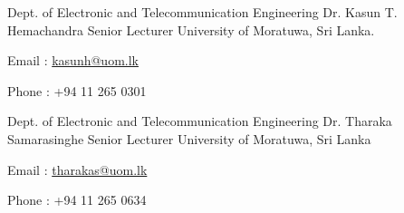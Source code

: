 


\begin{cventries}


\cventry
{Dept. of Electronic and Telecommunication Engineering} %
{Dr. Kasun T. Hemachandra} %
{Senior Lecturer} %
{University of Moratuwa, Sri Lanka.} %
{ %
\begin{cvitems}
\item {Email : \href{mailto:kasunh@uom.lk}{kasunh@uom.lk}}
\item {Phone : +94 11 265 0301}
\end{cvitems}
}


\cventry
{Dept. of Electronic and Telecommunication Engineering} %
{Dr. Tharaka Samarasinghe} %
{Senior Lecturer} %
{University of Moratuwa, Sri Lanka} %
{ %
\begin{cvitems}
\item {Email : \href{mailto:tharakas@uom.lk}{tharakas@uom.lk}}
\item {Phone : +94 11 265 0634}
\end{cvitems}
}


\end{cventries}